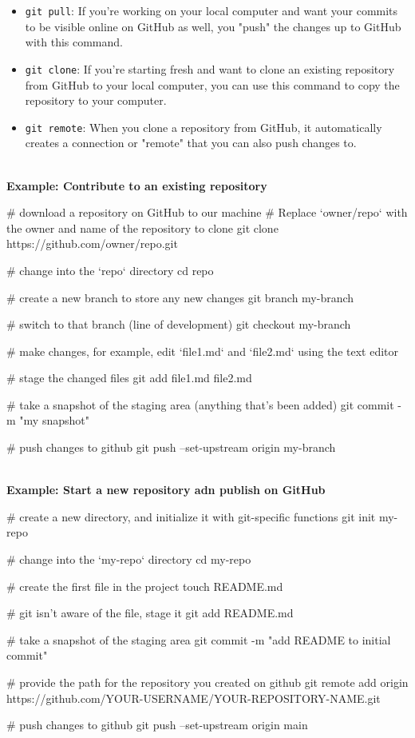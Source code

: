 \begin{itemize}
    \item \texttt{git pull}: If you're working on your local computer and want your commits to be visible online on GitHub as well, you "push" the changes up to GitHub with this command.
    \item \texttt{git clone}: If you're starting fresh and want to clone an existing repository from GitHub to your local computer, you can use this command to copy the repository to your computer.
    \item \texttt{git remote}: When you clone a repository from GitHub, it automatically creates a connection or "remote" that you can also push changes to.
\end{itemize}

\textbf{\\ Example: Contribute to an existing repository}
\begin{codeblock}[language=bash]
# download a repository on GitHub to our machine
# Replace `owner/repo` with the owner and name of the repository to clone
git clone https://github.com/owner/repo.git

# change into the `repo` directory
cd repo

# create a new branch to store any new changes
git branch my-branch

# switch to that branch (line of development)
git checkout my-branch

# make changes, for example, edit `file1.md` and `file2.md` using the text editor

# stage the changed files
git add file1.md file2.md

# take a snapshot of the staging area (anything that's been added)
git commit -m "my snapshot"

# push changes to github
git push --set-upstream origin my-branch
\end{codeblock}

\textbf{\\ Example: Start a new repository adn publish on GitHub}
\begin{codeblock}[language=bash]
# create a new directory, and initialize it with git-specific functions
git init my-repo

# change into the `my-repo` directory
cd my-repo

# create the first file in the project
touch README.md

# git isn't aware of the file, stage it
git add README.md

# take a snapshot of the staging area
git commit -m "add README to initial commit"

# provide the path for the repository you created on github
git remote add origin https://github.com/YOUR-USERNAME/YOUR-REPOSITORY-NAME.git

# push changes to github
git push --set-upstream origin main
\end{codeblock}


